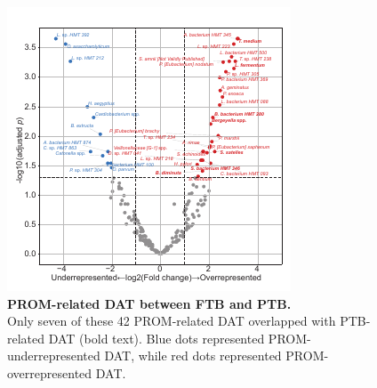 \documentclass[11pt, a4paper, onecolumn, oneside]{report}
\begin{document}
            \begin{figure}[p]
                \centering
                \includegraphics[width=\linewidth]{Figures/PTB/FigS2-PROM.pdf}
                \caption[PROM-related DAT between FTB and PTB]{\textbf{PROM-related DAT between FTB and PTB.} \\
                    Only seven of these 42 PROM-related DAT overlapped with PTB-related DAT (bold text). Blue dots represented PROM-underrepresented DAT, while red dots represented PROM-overrepresented DAT.}
                \label{fig:PTB-volcano}
            \end{figure}
            \clearpage
\end{document}
